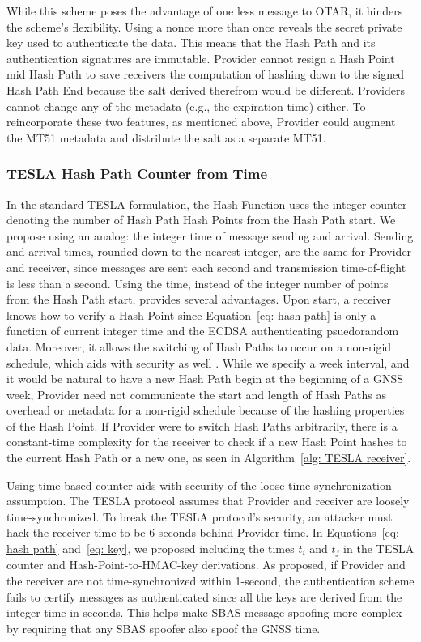\documentclass[APA,STIX1COL]{IONjournal/ION-APA Template}
\begin{document}
			While this scheme poses the advantage of one less message to OTAR, it hinders the scheme's flexibility.
			Using a nonce more than once reveals the secret private key used to authenticate the data.
			This means that the Hash Path and its authentication signatures are immutable.
			Provider cannot resign a Hash Point mid Hash Path to save receivers the computation of hashing down to the signed Hash Path End because the salt derived therefrom would be different.
			Providers cannot change any of the metadata (e.g., the expiration time) either.
			To reincorporate these two features, as mentioned above, Provider could augment the MT51 metadata and distribute the salt as a separate MT51.

		\subsubsection{TESLA Hash Path Counter from Time} \label{subsub:time_counter}

			In the standard TESLA formulation, the Hash Function uses the integer counter denoting the number of Hash Path Hash Points from the Hash Path start.
			We propose using an analog: the integer time of message sending and arrival.
			Sending and arrival times, rounded down to the nearest integer, are the same for Provider and receiver, since messages are sent each second and transmission time-of-flight is less than a second.
			Using the time, instead of the integer number of points from the Hash Path start, provides several advantages.
			Upon start, a receiver knows how to verify a Hash Point since Equation~\eqref{eq: hash path} is only a function of current integer time and the ECDSA authenticating psuedorandom data.
			Moreover, it allows the switching of Hash Paths to occur on a non-rigid schedule, which aids with security as well \cite{chain-security}.
			While we specify a week interval, and it would be natural to have a new Hash Path begin at the beginning of a GNSS week, Provider need not communicate the start and length of Hash Paths as overhead or metadata for a non-rigid schedule because of the hashing properties of the Hash Point.
			If Provider were to switch Hash Paths arbitrarily, there is a constant-time complexity for the receiver to check if a new Hash Point hashes to the current Hash Path or a new one, as seen in Algorithm~\ref{alg: TESLA receiver}.

			Using time-based counter aids with security of the loose-time synchronization assumption.
			The TESLA protocol assumes that Provider and receiver are loosely time-synchronized.
			To break the TESLA protocol's security, an attacker must hack the receiver time to be 6 seconds behind Provider time.
			In Equations~\eqref{eq: hash path} and~\eqref{eq: key}, we proposed including the times $t_i$ and $t_j$ in the TESLA counter and Hash-Point-to-HMAC-key derivations.
			As proposed, if Provider and the receiver are not time-synchronized within 1-second, the authentication scheme fails to certify messages as authenticated since all the keys are derived from the integer time in seconds.
			This helps make SBAS message spoofing more complex by requiring that any SBAS spoofer also spoof the GNSS time.
\end{document}
